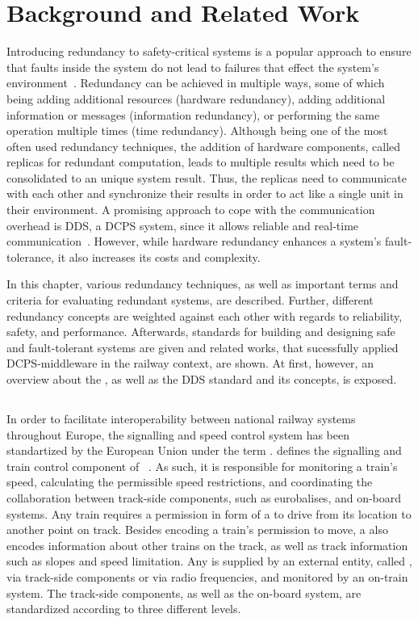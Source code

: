 \chapter{Background and Related Work}
\label{chptr:concepts}

Introducing redundancy to safety-critical systems is a popular approach to ensure that faults inside the system do not lead to failures that effect the system's environment~\cite{BarryFaultToleranceAnalysis}.
Redundancy can be achieved in multiple ways, some of which being adding additional resources (hardware redundancy), adding additional information or messages (information redundancy), or performing the same operation multiple times (time redundancy).
Although being one of the most often used redundancy techniques, the addition of hardware components, called replicas for redundant computation, leads to multiple results which need to be consolidated to an unique system result.
Thus, the replicas need to communicate with each other and synchronize their results in order to act like a single unit in their environment.
A promising approach to cope with the communication overhead is \gls*{DDS}, a \gls*{DCPS} system, since it allows reliable and real-time communication~\cite{omgDDSspec}.
However, while hardware redundancy enhances a system's fault-tolerance, it also increases its costs and complexity.

In this chapter, various redundancy techniques, as well as important terms and criteria for evaluating redundant systems, are described.
Further, different redundancy concepts are weighted against each other with regards to reliability, safety, and performance.
Afterwards, standards for building and designing safe and fault-tolerant systems are given and related works, that sucessfully applied \gls*{DCPS}-middleware in the railway context, are shown.
At first, however, an overview about the , as well as the \gls*{DDS} standard and its concepts, is exposed.

\section{}
In order to facilitate interoperability between national railway systems throughout Europe, the signalling and speed control system has been standartized by the European Union under the term .
 defines the signalling and train control component of ~\cite{ETCS26}.
As such, it is responsible for monitoring a train's speed, calculating the permissible speed restrictions, and coordinating the collaboration between track-side components, such as  eurobalises, and on-board systems.
Any train requires a permission in form of a  to drive from its location to another point on track.
Besides encoding a train's permission to move, a  also encodes information about other trains on the track, as well as track information such as slopes and speed limitation.
Any  is supplied by an external entity, called , via track-side components or via radio frequencies, and monitored by an on-train system.
The track-side components, as well as the on-board system, are standardized according to three different  levels.

